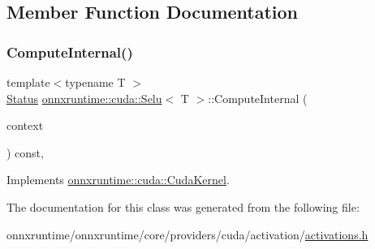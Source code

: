 \subsection{Member Function Documentation}
\mbox{\label{classonnxruntime_1_1cuda_1_1Selu_aa7d48c140b4f549b220a6493d1c53be9}} 
\subsubsection{\texorpdfstring{Compute\+Internal()}{ComputeInternal()}}
{\footnotesize\ttfamily template$<$typename T $>$ \\
\mbox{\hyperlink{classonnxruntime_1_1common_1_1Status}{Status}} \mbox{\hyperlink{classonnxruntime_1_1cuda_1_1Selu}{onnxruntime\+::cuda\+::\+Selu}}$<$ T $>$\+::Compute\+Internal (\begin{DoxyParamCaption}\item[{\mbox{\hyperlink{classonnxruntime_1_1OpKernelContext}{Op\+Kernel\+Context}} $\ast$}]{context }\end{DoxyParamCaption}) const\hspace{0.3cm}{\ttfamily [override]}, {\ttfamily [virtual]}}



Implements \mbox{\hyperlink{classonnxruntime_1_1cuda_1_1CudaKernel_aca7af04ae448017d6023d30bba231ebb}{onnxruntime\+::cuda\+::\+Cuda\+Kernel}}.



The documentation for this class was generated from the following file\+:\begin{DoxyCompactItemize}
\item 
onnxruntime/onnxruntime/core/providers/cuda/activation/\mbox{\hyperlink{cuda_2activation_2activations_8h}{activations.\+h}}\end{DoxyCompactItemize}
